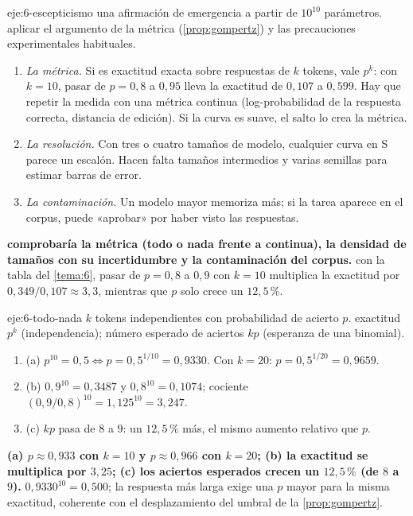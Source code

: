 \begin{solucion}{eje:6-escepticismo}
\datos una afirmación de emergencia a partir de $10^{10}$ parámetros.
\planteamiento aplicar el argumento de la métrica (\cref{prop:gompertz}) y las precauciones experimentales habituales.
\pasos
\begin{enumerate}[label=\arabic*.]
  \item \emph{La métrica.} Si es exactitud exacta sobre respuestas de $k$ tokens, vale $p^{k}$: con $k=10$, pasar de $p=0{,}8$ a $0{,}95$ lleva la exactitud de $0{,}107$ a $0{,}599$. Hay que repetir la medida con una métrica continua (log-probabilidad de la respuesta correcta, distancia de edición). Si la curva es suave, el salto lo crea la métrica.
  \item \emph{La resolución.} Con tres o cuatro tamaños de modelo, cualquier curva en S parece un escalón. Hacen falta tamaños intermedios y varias semillas para estimar barras de error.
  \item \emph{La contaminación.} Un modelo mayor memoriza más; si la tarea aparece en el corpus, puede «aprobar» por haber visto las respuestas.
\end{enumerate}
\resultado \textbf{comprobaría la métrica (todo o nada frente a continua), la densidad de tamaños con su incertidumbre y la contaminación del corpus.}
\comprobacion con la tabla del \cref{tema:6}, pasar de $p=0{,}8$ a $0{,}9$ con $k=10$ multiplica la exactitud por $0{,}349/0{,}107\approx 3{,}3$, mientras que $p$ solo crece un $12{,}5\,\%$.
\end{solucion}

\begin{solucion}{eje:6-todo-nada}
\datos $k$ tokens independientes con probabilidad de acierto $p$.
\planteamiento exactitud $p^{k}$ (independencia); número esperado de aciertos $kp$ (esperanza de una binomial).
\pasos
\begin{enumerate}[label=\arabic*.]
  \item (a) $p^{10}=0{,}5\iff p=0{,}5^{1/10}=0{,}9330$. Con $k=20$: $p=0{,}5^{1/20}=0{,}9659$.
  \item (b) $0{,}9^{10}=0{,}3487$ y $0{,}8^{10}=0{,}1074$; cociente $(0{,}9/0{,}8)^{10}=1{,}125^{10}=3{,}247$.
  \item (c) $kp$ pasa de $8$ a $9$: un $12{,}5\,\%$ más, el mismo aumento relativo que $p$.
\end{enumerate}
\resultado \textbf{(a) $p\approx 0{,}933$ con $k=10$ y $p\approx 0{,}966$ con $k=20$; (b) la exactitud se multiplica por $3{,}25$; (c) los aciertos esperados crecen un $12{,}5\,\%$ (de $8$ a $9$).}
\comprobacion $0{,}9330^{10}=0{,}500$; la respuesta más larga exige una $p$ mayor para la misma exactitud, coherente con el desplazamiento del umbral de la \cref{prop:gompertz}.
\end{solucion}

